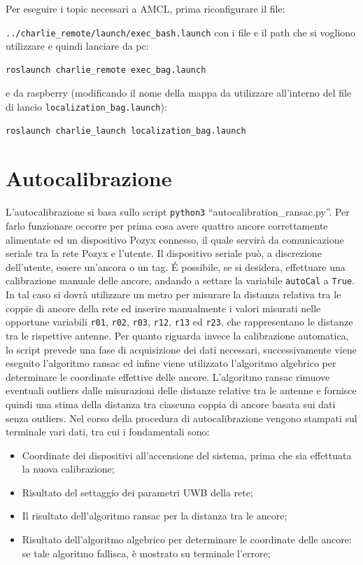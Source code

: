 Per eseguire i topic necessari a AMCL, prima riconfigurare il file:

\verb|../charlie_remote/launch/exec_bash.launch| con i file e il path che si vogliono utilizzare e quindi lanciare da pc:
\begin{lstlisting}[style=bashPC]
	roslaunch charlie_remote exec_bag.launch
\end{lstlisting}
e da raspberry (modificando il nome della mappa da utilizzare all'interno del file di lancio \verb|localization_bag.launch|):
\begin{lstlisting}[style=bash]
	roslaunch charlie_launch localization_bag.launch
\end{lstlisting}

\newpage
\appendix
\section{Autocalibrazione}
L'autocalibrazione si basa sullo script \texttt{python3} ``autocalibration\_ransac.py''. 
Per farlo funzionare occorre per prima cosa avere quattro ancore correttamente alimentate ed un dispositivo Pozyx connesso, il quale servirà da comunicazione seriale tra la rete Pozyx e l’utente. 
Il dispositivo seriale può, a discrezione dell’utente, essere un’ancora o un tag. 
É possibile, se si desidera, effettuare una calibrazione manuale delle ancore, andando a settare la variabile \verb|autoCal| a \verb|True|. 
In tal caso si dovrà utilizzare un metro per misurare la distanza relativa tra le coppie di ancore della rete ed inserire manualmente i valori misurati nelle opportune variabili \texttt{r01}, \texttt{r02}, \texttt{r03}, \texttt{r12}, \texttt{r13} ed \texttt{r23}, che rappresentano le distanze tra le rispettive antenne.
Per quanto riguarda invece la calibrazione automatica, lo script prevede una fase di acquisizione dei dati necessari, successivamente viene eseguito l’algoritmo ransac ed infine viene utilizzato l’algoritmo algebrico per determinare le coordinate effettive delle ancore. 
L’algoritmo ransac rimuove eventuali outliers dalle misurazioni delle distanze relative tra le antenne e fornisce quindi una stima della distanza tra ciascuna coppia di ancore basata sui dati senza outliers.
Nel corso della procedura di autocalibrazione vengono stampati sul terminale vari dati, tra cui i fondamentali sono:
\begin{itemize}
	\item Coordinate dei dispositivi all’accensione del sistema, prima che sia effettuata la nuova calibrazione;
	
	\item Risultato del settaggio dei parametri UWB della rete;
	
	\item Il risultato dell’algoritmo ransac per la distanza tra le ancore;
	
	\item Risultato dell'algoritmo algebrico per determinare le coordinate delle ancore: se tale algoritmo fallisca, \`e mostrato su terminale l'errore;
\end{itemize}



\newpage



